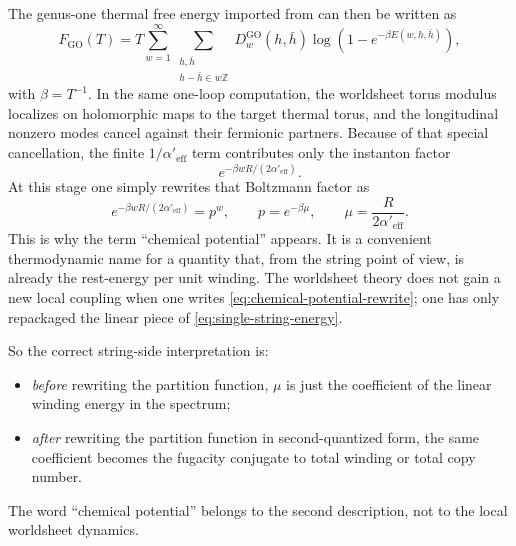 \documentclass[11pt]{article}
\newcommand{\Aeff}{\alpha'_{\mathrm{eff}}}
\begin{document}
The genus-one thermal free energy imported from \cite{gomis2000nonrelativisticclosedstringtheory} can then be written as
\begin{equation}\label{eq:go-free-energy-note}
F_{\mathrm{GO}}(T)=
T\sum_{w=1}^{\infty}
\sum_{\substack{h,\bar h\\ h-\bar h\in w\mathbb Z}}
D_w^{\mathrm{GO}}(h,\bar h)
\log\!\left(
1-e^{-\beta E(w,h,\bar h)}
\right),
\end{equation}
with $\beta=T^{-1}$. In the same one-loop computation, the worldsheet torus modulus localizes on holomorphic maps to the target thermal torus, and the longitudinal nonzero modes cancel against their fermionic partners. Because of that special cancellation, the finite $1/\Aeff$ term contributes only the instanton factor
\begin{equation}\label{eq:instantonic-boltzmann}
e^{-\beta wR/(2\Aeff)}.
\end{equation}
At this stage one simply rewrites that Boltzmann factor as
\begin{equation}\label{eq:chemical-potential-rewrite}
e^{-\beta wR/(2\Aeff)}=p^w,
\qquad
p=e^{-\beta\mu},
\qquad
\mu=\frac{R}{2\Aeff}.
\end{equation}
This is why the term ``chemical potential'' appears. It is a convenient thermodynamic name for a quantity that, from the string point of view, is already the rest-energy per unit winding. The worldsheet theory does not gain a new local coupling when one writes \eqref{eq:chemical-potential-rewrite}; one has only repackaged the linear piece of \eqref{eq:single-string-energy}.

So the correct string-side interpretation is:
\begin{itemize}
\item \emph{before} rewriting the partition function, $\mu$ is just the coefficient of the linear winding energy in the spectrum;
\item \emph{after} rewriting the partition function in second-quantized form, the same coefficient becomes the fugacity conjugate to total winding or total copy number.
\end{itemize}
The word ``chemical potential'' belongs to the second description, not to the local worldsheet dynamics.
\end{document}
